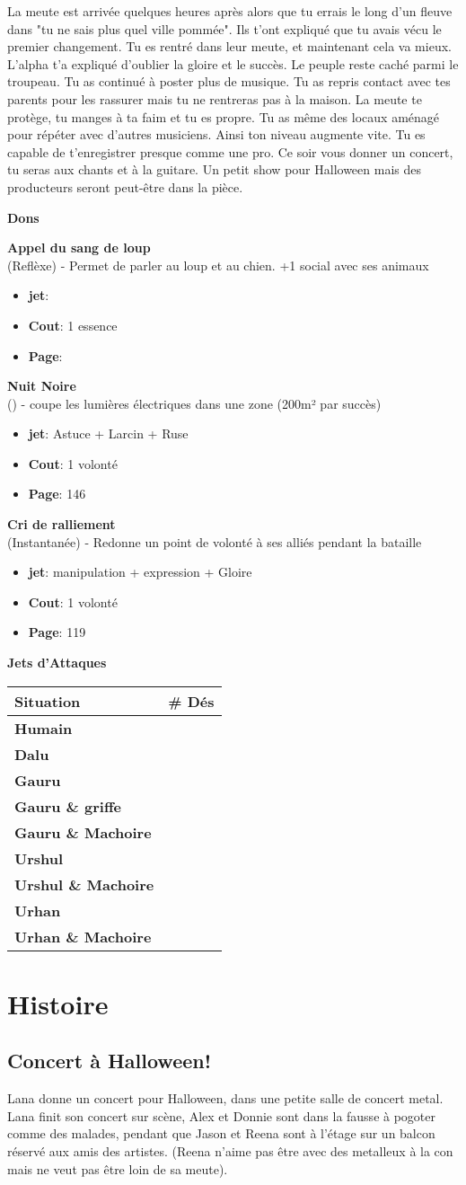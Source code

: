 \documentclass[oneside,12pt]{book}
\newcommand\don[6]{
\textbf{#1} \\
(#6) - #2
\begin{itemize}
\item{ \textbf{jet}: #3}
\item{ \textbf{Cout}: #4}
\item{ \textbf{Page}: #5}
\end{itemize}
\vspace{0.5cm}
}
\newcounter{Somme}
\newcommand\attackRoll[1]{
\setcounter{Somme}{#1}
\textbf{Jets d'Attaques} \\
\begin{tabularx}{7cm}{|X|c|}
\hline
\textbf{Situation} & \textbf{\# Dés} \\
\hline
\textbf{Humain} & \theSomme \\
\hline
\addtocounter{Somme}{1}
\textbf{Dalu} & \theSomme \\
\hline
\addtocounter{Somme}{2}
\textbf{Gauru}& \theSomme \\
\hline
\addtocounter{Somme}{1}
\textbf{Gauru \& griffe}& \theSomme \\
\hline
\addtocounter{Somme}{1}
\textbf{Gauru \& Machoire}& \theSomme \\
\hline
\setcounter{Somme}{#1}
\addtocounter{Somme}{2}
\textbf{Urshul}& \theSomme \\
\hline
\addtocounter{Somme}{2}
\textbf{Urshul \& Machoire}& \theSomme \\
\hline
\setcounter{Somme}{#1}
\textbf{Urhan}& \theSomme \\
\hline
\addtocounter{Somme}{2}
\textbf{Urhan \& Machoire}& \theSomme \\
\hline
\end{tabularx}

}
\begin{document}
\begin{flushleft}
\begin{description}
{La meute est arrivée quelques heures après alors que tu errais le long d'un fleuve dans "tu ne sais plus quel ville pommée". Ils t'ont expliqué que tu avais vécu le premier changement. Tu es rentré dans leur meute, et maintenant cela va mieux. L'alpha t'a expliqué d'oublier la gloire et le succès. Le peuple reste caché parmi le troupeau. 
Tu as continué à poster plus de musique. Tu as repris contact avec tes parents pour les rassurer mais tu ne rentreras pas à la maison. La meute te protège, tu manges à ta faim et tu es propre. Tu as même des locaux aménagé pour répéter avec d'autres musiciens. Ainsi ton niveau augmente vite. Tu es capable de t'enregistrer presque comme une pro. Ce soir vous donner un concert, tu seras aux chants et à la guitare. Un petit show pour Halloween mais des producteurs seront peut-être dans la pièce. 
 }
\end{description}
\clearpage
\textbf{\large Dons} 
\vspace{0.5cm}

\don{Appel du sang de loup}{Permet de parler au loup et au chien. +1 social avec ses animaux}{}{1 essence}{}{Reflèxe}
\don{Nuit Noire}{coupe les lumières électriques dans une zone (200m² par succès)}{Astuce + Larcin + Ruse}{1 volonté}{146}{}
\don{Cri de ralliement}{Redonne un point de volonté à ses alliés pendant la bataille}{manipulation + expression + Gloire}{1 volonté}{119}{Instantanée}
\attackRoll{4}


\clearpage









\chapter{Histoire}

\section{Concert à Halloween!}
Lana donne un concert pour Halloween, dans une petite salle de concert metal. Lana finit son concert sur scène, Alex et Donnie sont dans la fausse à pogoter comme des malades, pendant que Jason et Reena sont à l'étage sur un balcon réservé aux amis des artistes. (Reena n'aime pas être avec des metalleux à la con mais ne veut pas être loin de sa meute). 



\end{flushleft}
\end{document}
